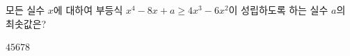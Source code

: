 모든 실수 $x$에 대하여 부등식 $x^4-8x+a\ge 4x^3-6x^2$이 성립하도록 하는 실수 $a$의 최솟값은?
\begin{choices32}{$4$}{$5$}{$6$}{$7$}{$8$}\end{choices32}

